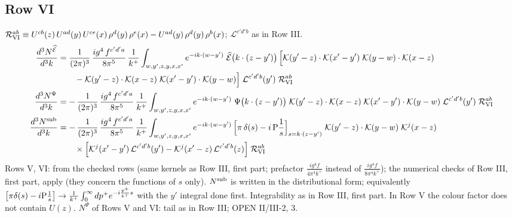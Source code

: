 \documentclass[9pt]{article}
\numberwithin{equation}{section}
\begin{document}
\subsection{Row VI}
\noindent $\mathcal{R}_{\rm VI}^{ab}\equiv U^{cb}(z)\,U^{ad}(y)\,U^{ce}(x)\,\rho^{d}(y)\,\rho^{e}(x)-U^{ad}(y)\,\rho^{d}(y)\,\rho^{b}(x)$; $\mathcal{L}^{c'd'b}$ as in Row III.
\begin{align}
\frac{d^{3}N^{\widehat{\mathcal{E}}}}{d^{3}k} & = \frac{1}{(2\pi)^{3}}\, \frac{ig^{4}\,f^{c'd'a}}{8\pi^{5}}\, \frac{1}{k^{+}}\int_{w,y',z,y,x,x'} e^{-ik\cdot (w-y')}\;\widehat{\mathcal{E}}\big(k\cdot(z-y')\big)\,\Big[\mathcal{K}(y'-z)\cdot\mathcal{K}(x'-y')\;\mathcal{K}(y-w)\cdot\mathcal{K}(x-z)\notag \\ & \qquad-\mathcal{K}(y'-z)\cdot\mathcal{K}(x-z)\;\mathcal{K}(x'-y')\cdot\mathcal{K}(y-w)\Big]\;\mathcal{L}^{c'd'b}(y')\;\mathcal{R}_{\rm VI}^{ab}\\
\frac{d^{3}N^{\Psi}}{d^{3}k} & = -\,\frac{1}{(2\pi)^{3}}\, \frac{ig^{4}\,f^{c'd'a}}{8\pi^{5}}\, \frac{1}{k^{+}}\int_{w,y',z,y,x,x'} e^{-ik\cdot (w-y')}\;\Psi\big(k\cdot(z-y')\big)\;\mathcal{K}(y'-z)\cdot\mathcal{K}(x-z)\;\mathcal{K}(x'-y')\cdot\mathcal{K}(y-w)\;\mathcal{L}^{c'd'b}(y')\;\mathcal{R}_{\rm VI}^{ab}\\
\frac{d^{3}N^{\rm sub}}{d^{3}k} & = -\,\frac{1}{(2\pi)^{3}}\, \frac{ig^{4}\,f^{c'd'a}}{8\pi^{5}}\, \frac{1}{k^{+}}\int_{w,y',z,y,x,x'} e^{-ik\cdot (w-y')}\,\Big[\pi\,\delta(s)-i\,{\rm P}\frac{1}{s}\Big]_{s=k\cdot(z-y')}\;\mathcal{K}(y'-z)\cdot\mathcal{K}(y-w)\;\mathcal{K}^{j}(x-z)\notag \\ & \qquad\times\Big[\mathcal{K}^{j}(x'-y')\,\mathcal{L}^{c'd'b}(y')-\mathcal{K}^{j}(x'-z)\,\mathcal{L}^{c'd'b}(z)\Big]\;\mathcal{R}_{\rm VI}^{ab}
\end{align}
{\color{gray}\small Rows V, VI: from the checked rows (same kernels as Row III, first part; prefactor $\frac{ig^{4}f}{4\pi^{4}k^{+}}$ instead of $\frac{ig^{4}f}{8\pi^{4}k^{+}}$); the numerical checks of Row III, first part, apply (they concern the functions of $s$ only). $N^{\rm sub}$ is written in the distributional form; equivalently $\big[\pi\delta(s)-i{\rm P}\frac1s\big]\to\frac{1}{k^{+}}\int_{0}^{\infty}dp^{+}e^{-i\frac{p^{+}}{k^{+}}s}$ with the $y'$ integral done first. Integrability as in Row III, first part. In Row V the colour factor does not contain $U(z)$.} {\color{magenta}$N^{\Psi}$ of Rows V and VI: tail as in Row III; OPEN II/III-2, 3.}
\end{document}
